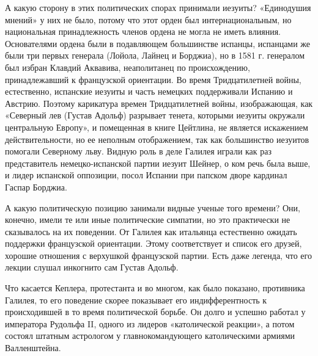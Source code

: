 А какую сторону в этих политических спорах принимали иезуиты? «Единодушия
мнений» у них не было, потому что этот орден был интернациональным, но
национальная принадлежность членов ордена не могла не иметь влияния.
Основателями ордена были в подавляющем большинстве испанцы, испанцами же были
три первых генерала (Лойола, Лайнец и Борджиа), но в 1581 г. генералом был
избран Клавдий Аквавива, неаполитанец по происхождению, принадлежавший к
французской ориентации. Во время Тридцатилетней войны, естественно, испанские
иезуиты и часть немецких поддерживали Испанию и Австрию. Поэтому карикатура
времен Тридцатилетней войны, изображающая, как «Северный лев (Густав Адольф)
разрывает тенета, которыми иезуиты окружали центральную Европу», и помещенная в
книге Цейтлина, не является искажением действительности, но ее неполным
отображением, так как большинство иезуитов помогали Северному льву. Видную роль
в деле Галилея играли как раз представитель немецко-испанской партии иезуит
Шейнер, о ком речь была выше, и лидер испанской оппозиции, посол Испании при
папском дворе кардинал Гаспар Борджиа.

А какую политическую позицию занимали видные ученые того времени? Они, конечно,
имели те или иные политические симпатии, но это практически не сказывалось на
их поведении. От Галилея как итальянца естественно ожидать поддержки
французской ориентации. Этому соответствует и список его друзей, хорошие
отношения с верхушкой французской партии. Есть даже легенда, что его лекции
слушал инкогнито сам Густав Адольф.

Что касается Кеплера, протестанта и во многом, как было показано, противника
Галилея, то его поведение скорее показывает его индифферентность к
происходившей в то время политической борьбе. Он долго и успешно работал у
императора Рудольфа II, одного из лидеров «католической реакции», а потом
состоял штатным астрологом у главнокомандующего католическими армиями
Валленштейна.

